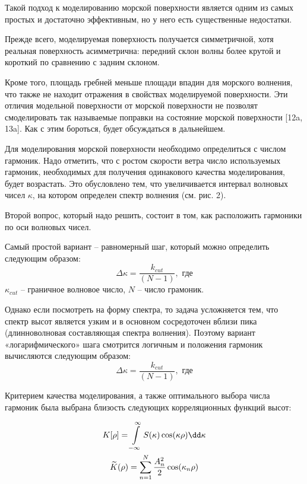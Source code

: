 Такой подход к моделированию морской поверхности является одним из самых простых и достаточно эффективным, но у него есть существенные недостатки.

Прежде всего, моделируемая поверхность получается симметричной, хотя реальная поверхность асимметрична: передний склон волны более крутой и короткий по сравнению с задним склоном.

Кроме того, площадь гребней меньше площади впадин для морского волнения, что также не находит отражения в свойствах моделируемой поверхности. Эти отличия 
модельной поверхности от морской поверхности не позволят смоделировать так называемые поправки на состояние морской поверхности [12a, 13a]. Как с этим бороться, будет обсуждаться в дальнейшем.

Для моделирования морской поверхности необходимо определиться с числом
гармоник. Надо отметить, что с ростом скорости ветра число используемых
гармоник, необходимых для получения одинакового качества моделирования, будет
возрастать. Это обусловлено тем, что увеличивается интервал волновых чисел
$\kappa$, на котором определен спектр волнения (см. рис. 2). 

Второй вопрос, который надо решить, состоит в том, как расположить гармоники по оси волновых чисел. 


Самый простой вариант – равномерный шаг, который можно определить следующим образом:
\begin{equation}
    \Delta \kappa = \frac{k_{cut}}{(N-1)}, \text{ где}
\end{equation}
$\kappa_{cut}$ -- граничное волновое число, $N$ -- число грамоник.

Однако если посмотреть на форму спектра, то задача усложняется тем, что спектр высот является узким и в основном сосредоточен вблизи пика (длинноволновая составляющая спектра волнения). Поэтому вариант «логарифмического» шага смотрится логичным и положения гармоник вычисляются следующим образом:
\begin{equation}
    \Delta \kappa = \frac{k_{cut}}{(N-1)}, \text{ где}
\end{equation}

Критерием качества моделирования, а также оптимального выбора числа гармоник
была выбрана близость следующих корреляционных функций высот:

\begin{gather}
    \label{eq:KK}
    K[\rho] = \int\limits_{-\infty}^{\infty} S(\kappa) \cos(\kappa\rho) \dd \kappa\\
    \tK(\rho) = \sum\limits_{n=1}^{N} \frac{A_n^2}{2} \cos(\kappa_n \rho)
\end{gather}


